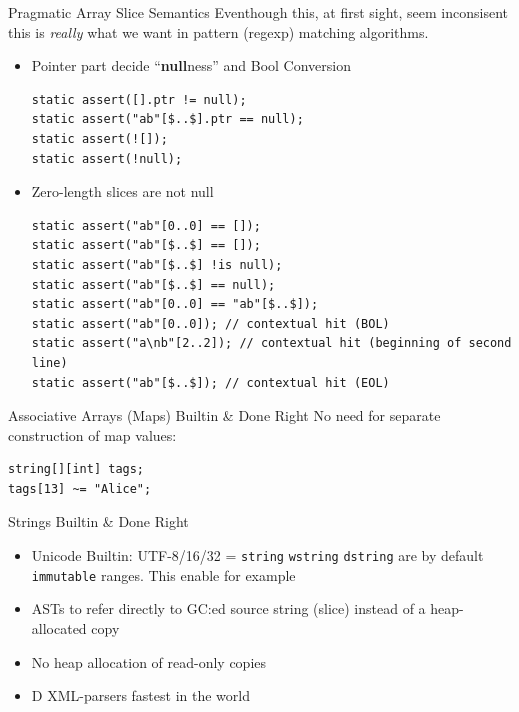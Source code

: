 \documentclass[xcolor=dvipsnames]{beamer}
\begin{document}
\begin{frame}[fragile]{Pragmatic Array Slice Semantics}
  Eventhough this, at first sight, seem inconsisent this is \emph{really} what
  we want in pattern (regexp) matching algorithms.
  \begin{itemize}[<+->]

  \item Pointer part decide ``\textbf{null}ness'' and Bool Conversion
    \begin{lstlisting}[frame=single]
static assert([].ptr != null);
static assert("ab"[$..$].ptr == null);
static assert(![]);
static assert(!null);
    \end{lstlisting}
  \item Zero-length slices are not null
    \begin{lstlisting}[frame=single]
static assert("ab"[0..0] == []);
static assert("ab"[$..$] == []);
static assert("ab"[$..$] !is null);
static assert("ab"[$..$] == null);
static assert("ab"[0..0] == "ab"[$..$]);
static assert("ab"[0..0]); // contextual hit (BOL)
static assert("a\nb"[2..2]); // contextual hit (beginning of second line)
static assert("ab"[$..$]); // contextual hit (EOL)
    \end{lstlisting}

  \end{itemize}
\end{frame}

\begin{frame}[fragile]{Associative Arrays (Maps) Builtin \& Done Right}
  No need for separate construction of map values:
  \begin{lstlisting}[frame=single]
string[][int] tags;
tags[13] ~= "Alice";
  \end{lstlisting}
\end{frame}

\begin{frame}[fragile]{Strings Builtin \& Done Right}
  \begin{itemize}[<+->]
  \item Unicode Builtin: UTF-8/16/32 = \texttt{string} \texttt{wstring}
    \texttt{dstring} are by default \texttt{immutable} ranges. This enable for
    example
  \item ASTs to refer directly to GC:ed source string (slice) instead of a
    heap-allocated copy
  \item No heap allocation of read-only copies
  \item D XML-parsers fastest in the world
  \end{itemize}
\end{frame}
\end{document}
